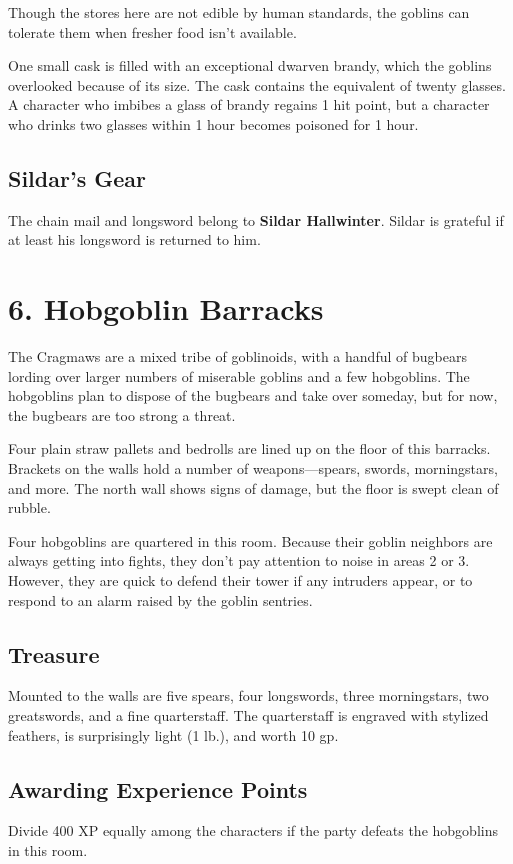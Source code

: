\documentclass[10pt,a4paper,twoside,bg=print,twocolumn,openany,nodeprecatedcode]{dndbook}
\begin{document}
Though the stores here are not edible by human standards, the goblins can tolerate them when fresher food isn't available.

One small cask is filled with an exceptional dwarven brandy, which the goblins overlooked because of its size. The cask contains the equivalent of twenty glasses. A character who imbibes a glass of brandy regains 1 hit point, but a character who drinks two glasses within 1 hour becomes poisoned for 1 hour.

\subsection{Sildar's Gear}
The chain mail and longsword belong to \textbf{Sildar Hallwinter}. Sildar is grateful if at least his longsword is returned to him.

\section{6. Hobgoblin Barracks}
The Cragmaws are a mixed tribe of goblinoids, with a handful of bugbears lording over larger numbers of miserable goblins and a few hobgoblins. The hobgoblins plan to dispose of the bugbears and take over someday, but for now, the bugbears are too strong a threat.

\begin{DndReadAloud}{}
Four plain straw pallets and bedrolls are lined up on the floor of this barracks. Brackets on the walls hold a number of weapons—spears, swords, morningstars, and more. The north wall shows signs of damage, but the floor is swept clean of rubble.

\end{DndReadAloud}

Four hobgoblins are quartered in this room. Because their goblin neighbors are always getting into fights, they don't pay attention to noise in areas 2 or 3. However, they are quick to defend their tower if any intruders appear, or to respond to an alarm raised by the goblin sentries.

\subsection{Treasure}
Mounted to the walls are five spears, four longswords, three morningstars, two greatswords, and a fine quarterstaff. The quarterstaff is engraved with stylized feathers, is surprisingly light (1 lb.), and worth 10 gp.

\subsection{Awarding Experience Points}
Divide 400 XP equally among the characters if the party defeats the hobgoblins in this room.
\end{document}
